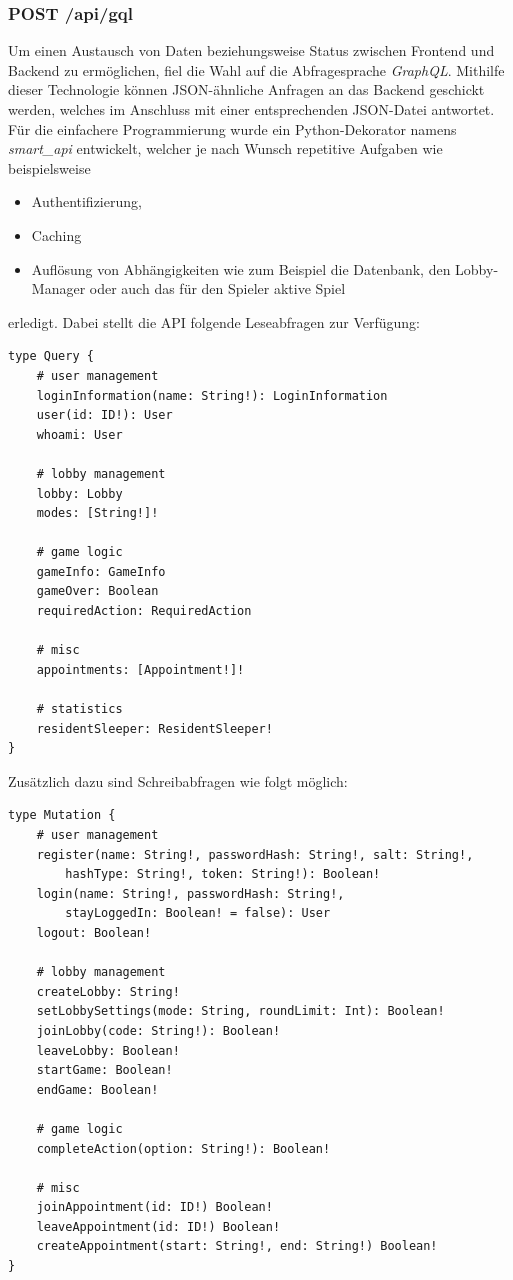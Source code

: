 \subsubsection{POST /api/gql}
Um einen Austausch von Daten beziehungsweise Status zwischen Frontend und Backend zu ermöglichen, fiel die Wahl auf die Abfragesprache \textit{GraphQL}. Mithilfe dieser Technologie können JSON-ähnliche Anfragen an das Backend geschickt werden, welches im Anschluss mit einer entsprechenden JSON-Datei antwortet. Für die einfachere Programmierung wurde ein Python-Dekorator namens \textit{smart\_api} entwickelt, welcher je nach Wunsch repetitive Aufgaben wie beispielsweise 
\begin{itemize}
	\item Authentifizierung, 
	\item Caching
	\item Auflösung von Abhängigkeiten wie zum Beispiel die Datenbank, den Lobby-Manager oder auch das für den Spieler aktive Spiel
\end{itemize}
erledigt. Dabei stellt die API folgende Leseabfragen zur Verfügung:

\begin{lstlisting}
type Query {
	# user management
	loginInformation(name: String!): LoginInformation
	user(id: ID!): User
	whoami: User
	
	# lobby management
	lobby: Lobby
	modes: [String!]!
	
	# game logic
	gameInfo: GameInfo
	gameOver: Boolean
	requiredAction: RequiredAction
	
	# misc
	appointments: [Appointment!]!
	
	# statistics
	residentSleeper: ResidentSleeper!
}
\end{lstlisting}

Zusätzlich dazu sind Schreibabfragen wie folgt möglich:

\begin{lstlisting}
type Mutation {
	# user management
	register(name: String!, passwordHash: String!, salt: String!, 
		hashType: String!, token: String!): Boolean!
	login(name: String!, passwordHash: String!, 
		stayLoggedIn: Boolean! = false): User
	logout: Boolean!
	
	# lobby management
	createLobby: String!
	setLobbySettings(mode: String, roundLimit: Int): Boolean!
	joinLobby(code: String!): Boolean!
	leaveLobby: Boolean!
	startGame: Boolean!
	endGame: Boolean!
	
	# game logic
	completeAction(option: String!): Boolean!
	
	# misc
	joinAppointment(id: ID!) Boolean!
	leaveAppointment(id: ID!) Boolean!
	createAppointment(start: String!, end: String!) Boolean!
}
\end{lstlisting}


